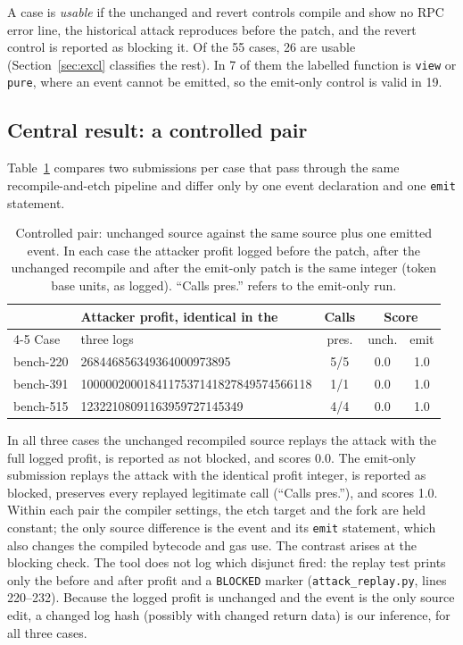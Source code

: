 \documentclass[conference]{IEEEtran}
\newcommand{\code}[1]{\texttt{#1}}
\begin{document}
A case is \emph{usable} if the unchanged and revert controls compile and show no RPC error line, the historical attack reproduces before the patch, and the revert control is reported as blocking it. Of the 55 cases, 26 are usable (Section~\ref{sec:excl} classifies the rest). In 7 of them the labelled function is \code{view} or \code{pure}, where an event cannot be emitted, so the emit-only control is valid in 19.

\subsection{Central result: a controlled pair}
\label{sec:pair}
Table~\ref{tab:pair} compares two submissions per case that pass through the same recompile-and-etch pipeline and differ only by one event declaration and one \code{emit} statement.

\begin{table}[t]
\caption{Controlled pair: unchanged source against the same source plus one emitted event. In each case the attacker profit logged before the patch, after the unchanged recompile and after the emit-only patch is the same integer (token base units, as logged). ``Calls pres.'' refers to the emit-only run.}
\label{tab:pair}
\centering
\footnotesize
\setlength{\tabcolsep}{3pt}
\begin{tabular}{@{}llccc@{}}
\toprule
 & Attacker profit, identical in the & Calls & \multicolumn{2}{c}{Score} \\
\cmidrule(l){4-5}
Case & three logs & pres. & unch. & emit \\
\midrule
bench-220 & {\scriptsize 268446856349364000973895} & 5/5 & 0.0 & 1.0 \\
bench-391 & {\scriptsize 1000002000184117537141827849574566118} & 1/1 & 0.0 & 1.0 \\
bench-515 & {\scriptsize 12322108091163959727145349} & 4/4 & 0.0 & 1.0 \\
\bottomrule
\end{tabular}
\end{table}

In all three cases the unchanged recompiled source replays the attack with the full logged profit, is reported as not blocked, and scores 0.0. The emit-only submission replays the attack with the identical profit integer, is reported as blocked, preserves every replayed legitimate call (``Calls pres.''), and scores 1.0. Within each pair the compiler settings, the etch target and the fork are held constant; the only source difference is the event and its \code{emit} statement, which also changes the compiled bytecode and gas use. The contrast arises at the blocking check. The tool does not log which disjunct fired: the replay test prints only the before and after profit and a \code{BLOCKED} marker (\code{attack\_replay.py}, lines 220--232). Because the logged profit is unchanged and the event is the only source edit, a changed log hash (possibly with changed return data) is our inference, for all three cases.
\end{document}
